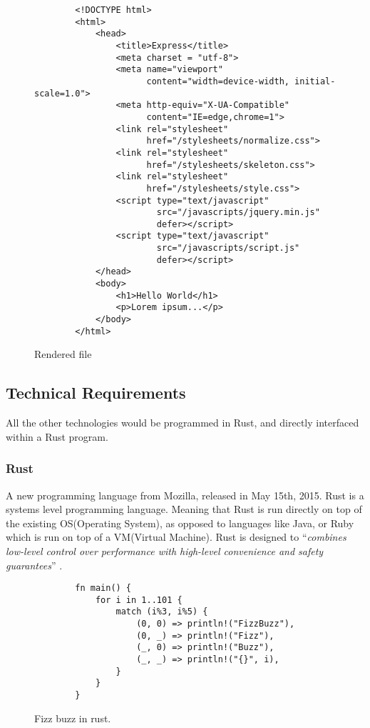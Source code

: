 \begin{figure}[ht!]
    \small
    \begin{verbatim}
        <!DOCTYPE html>
        <html>
            <head>
                <title>Express</title>
                <meta charset = "utf-8">
                <meta name="viewport" 
                      content="width=device-width, initial-scale=1.0">
                <meta http-equiv="X-UA-Compatible" 
                      content="IE=edge,chrome=1">
                <link rel="stylesheet" 
                      href="/stylesheets/normalize.css">
                <link rel="stylesheet" 
                      href="/stylesheets/skeleton.css">
                <link rel="stylesheet" 
                      href="/stylesheets/style.css">
                <script type="text/javascript" 
                        src="/javascripts/jquery.min.js" 
                        defer></script>
                <script type="text/javascript" 
                        src="/javascripts/script.js" 
                        defer></script>
            </head>
            <body>
                <h1>Hello World</h1>
                <p>Lorem ipsum...</p>
            </body>
        </html>
    \end{verbatim}
    \caption{Rendered file}
\end{figure}

\clearpage

\subsection{Technical Requirements}
All the other technologies would be programmed in Rust, and directly interfaced 
within a Rust program.

\subsubsection{Rust} 
A new programming language from Mozilla, released in May 15th, 2015.\cite{Rust}
Rust is a systems level programming language. Meaning that Rust is run directly on top of the existing
OS(Operating System), as opposed to languages like Java, or Ruby which is run on top of a VM(Virtual Machine).
Rust is designed to ``\textit{combines low-level control over performance with high-level convenience
and safety guarantees}'' \cite{Rust}.

\begin{figure}[ht!]
    \small
    \begin{verbatim}
        fn main() {
            for i in 1..101 {
                match (i%3, i%5) {
                    (0, 0) => println!("FizzBuzz"),
                    (0, _) => println!("Fizz"),
                    (_, 0) => println!("Buzz"),
                    (_, _) => println!("{}", i),
                }
            }
        }
    \end{verbatim}
    \caption{Fizz buzz in rust.}
\end{figure}


